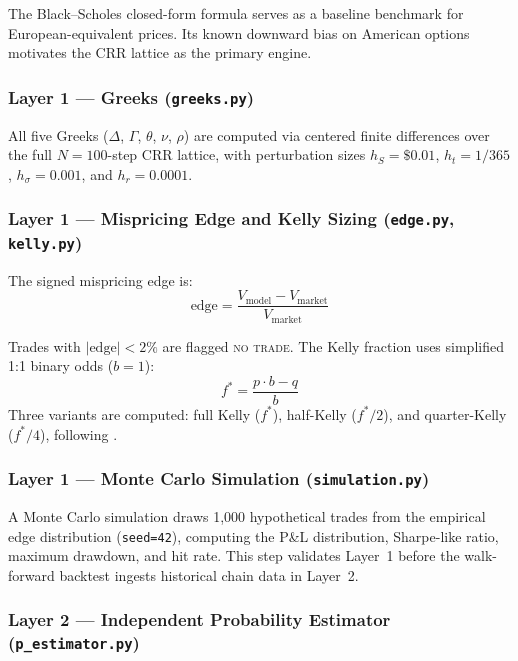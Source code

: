 \documentclass[12pt, letterpaper]{article}
\begin{document}
The Black--Scholes closed-form formula \citep{BlackScholes1973}
serves as a baseline benchmark for European-equivalent prices. Its
known downward bias on American options motivates the CRR lattice
as the primary engine.

\subsubsection{Layer 1 --- Greeks (\texttt{greeks.py})}

All five Greeks ($\Delta$, $\Gamma$, $\theta$, $\nu$, $\rho$) are
computed via centered finite differences over the full $N=100$-step
CRR lattice, with perturbation sizes $h_{S} = \$0.01$,
$h_{t} = 1/365$, $h_{\sigma} = 0.001$, and $h_{r} = 0.0001$.

\subsubsection{Layer 1 --- Mispricing Edge and Kelly Sizing
(\texttt{edge.py}, \texttt{kelly.py})}

The signed mispricing edge is:
\begin{equation}
  \text{edge} = \frac{V_{\text{model}} - V_{\text{market}}}
                     {V_{\text{market}}}
  \label{eq:edge}
\end{equation}

Trades with $|\text{edge}| < 2\%$ are flagged \textsc{no trade}.
The Kelly fraction uses simplified 1:1 binary odds ($b = 1$):
\begin{equation}
  f^{*} = \frac{p \cdot b - q}{b}
  \label{eq:kelly}
\end{equation}
Three variants are computed: full Kelly ($f^{*}$), half-Kelly
($f^{*}/2$), and quarter-Kelly ($f^{*}/4$), following
\citet{MacLean2010}.

\subsubsection{Layer 1 --- Monte Carlo Simulation
(\texttt{simulation.py})}

A Monte Carlo simulation draws 1,000 hypothetical trades from the
empirical edge distribution (\texttt{seed=42}), computing the P\&L
distribution, Sharpe-like ratio, maximum drawdown, and hit rate.
This step validates Layer~1 before the walk-forward backtest
ingests historical chain data in Layer~2.

\subsubsection{Layer 2 --- Independent Probability Estimator
(\texttt{p\_estimator.py})}
\end{document}
